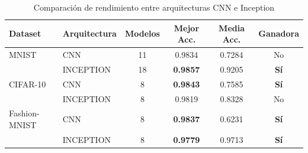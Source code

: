 \begin{table}[htbp]
\centering
\caption{Comparación de rendimiento entre arquitecturas CNN e Inception}
\label{tab:cnn_vs_inception}
\begin{tabular}{llcccc}
\toprule
\textbf{Dataset} & \textbf{Arquitectura} & \textbf{Modelos} & \textbf{Mejor Acc.} & \textbf{Media Acc.} & \textbf{Ganadora} \\
\midrule
  MNIST & CNN & 11 & 0.9834 & 0.7284 & No \\
   & INCEPTION & 18 & \textbf{0.9857} & 0.9205 & \textbf{Sí} \\
\midrule
  CIFAR-10 & CNN & 8 & \textbf{0.9843} & 0.7585 & \textbf{Sí} \\
   & INCEPTION & 8 & 0.9819 & 0.8328 & No \\
\midrule
  Fashion-MNIST & CNN & 8 & \textbf{0.9837} & 0.6231 & \textbf{Sí} \\
   & INCEPTION & 8 & \textbf{0.9779} & 0.9713 & \textbf{Sí} \\
\bottomrule
\end{tabular}
\end{table}